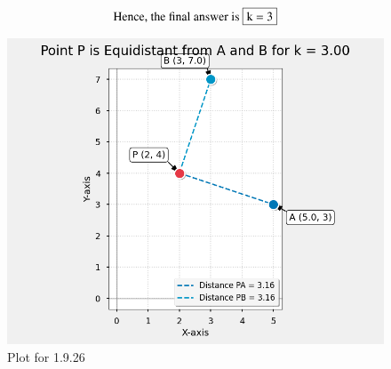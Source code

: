 \documentclass[journal,12pt,onecolumn]{IEEEtran}
\theoremstyle{remark}
\begin{document}
\begin{align}
 \text{Hence, the final answer is }\fbox{k = 3}   
\end{align}
\begin{figure}[H]
    \centering
    \includegraphics[width=1\columnwidth]{figs/1.png}
    \caption{Plot for 1.9.26}
    \label{fig:placeholder}
\end{figure}
\end{document}

